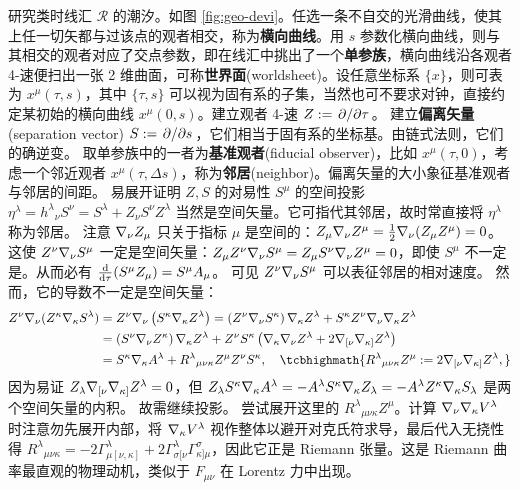 研究类时线汇 $\mathscr R$ 的潮汐。如图 \ref{fig:geo-devi}。任选一条不自交的光滑曲线，使其上任一切矢都与过该点的观者相交，称为\textbf{横向曲线}。用 $s$ 参数化横向曲线，则与其相交的观者对应了交点参数，即在线汇中挑出了一个\textbf{单参族}，横向曲线沿各观者 4-速便扫出一张 2 维曲面，可称\textbf{世界面}(worldsheet)。设任意坐标系 $\{x\}$，则可表为 $x^\mu(\tau,s)$，其中 $\{\tau,s\}$ 可以视为固有系的子集，当然也可不要求对钟，直接约定某初始的横向曲线 $x^\mu(0,s)$。建立观者 4-速 $Z:=\pdv*{\tau}$。
建立\textbf{偏离矢量}(separation vector) $S:=\pdv*{s}$，它们相当于固有系的坐标基。由链式法则，它们的确逆变。
取单参族中的一者为\textbf{基准观者}(fiducial observer)，比如 $x^\mu(\tau,0)$，考虑一个邻近观者 $x^\mu(\tau,\Delta s)$，称为\textbf{邻居}(neighbor)。偏离矢量的大小象征基准观者与邻居的间距。
易展开证明 $Z,S$ 的对易性
$S^\mu$ 的空间投影 $\eta^\lambda=h^\lambda{}_\nu S^\nu=S^\lambda+ Z_\nu S^\nu Z^\lambda$ 当然是空间矢量。它可指代其邻居，故时常直接将 $\eta^\lambda$ 称为邻居。
注意 $\nabla_\nu Z_\mu$ 只关于指标 $\mu$ 是空间的：$Z_\mu\nabla_\nu Z^\mu=\frac{1}{2}\nabla_\nu(Z_\mu Z^\mu)=0$。
这使 $Z^\nu\nabla_\nu S^\mu$ 一定是空间矢量：$Z_\mu Z^\nu \nabla_\nu S^\mu = Z_\mu S^\nu \nabla_\nu Z^\mu = 0$，即使 $S^\mu$ 不一定是。从而必有 $\dv{\tau}(S^\mu Z_\mu) = S^\mu A_\mu$。
可见 $Z^\nu\nabla_\nu S^\mu$ 可以表征邻居的相对速度。
然而，它的导数不一定是空间矢量：
\begin{align}
    Z^\nu \cd_\nu(Z^\kappa \cd_\kappa S^\lambda)&= Z^\nu \cd_\nu\left(S^\kappa\cd_\kappa Z^\lambda\right) = \left(Z^\nu \cd_\nu S^\kappa\right)\cd_\kappa Z^\lambda+S^\kappa Z^\nu \cd_\nu \cd_\kappa Z^\lambda\notag\\
    &= \left(S^\nu \cd_\nu Z^\kappa\right)\cd_\kappa Z^\lambda+Z^\nu S^\kappa\left(\cd_\kappa \cd_\nu Z^\lambda+2\cd_{[\nu}\cd_{\kappa]}Z^\lambda\right)\notag\\
    &=S^\kappa\cd_\kappa A^\lambda + R^\lambda{}_{\mu\nu\kappa} Z^\mu Z^\nu S^\kappa,\quad\tcbhighmath{R^\lambda{}_{\mu\nu\kappa}Z^\mu:= 2\cd_{[\nu}\cd_{\kappa]}Z^\lambda,}
\end{align}
因为易证 $Z_\lambda\nabla_{[\nu}\nabla_{\kappa]}Z^\lambda = 0$，但 $Z_\lambda S^\kappa\nabla_\kappa A^\lambda = -A^\lambda S^\kappa\nabla_\kappa Z_\lambda = -A^\lambda Z^\kappa\nabla_\kappa S_\lambda$ 是两个空间矢量的内积。
故需继续投影。
尝试展开这里的 $R^\lambda{}_{\mu\nu\kappa}Z^\mu$。计算 $\nabla_\nu\nabla_\kappa V^\lambda$ 时注意勿先展开内部，将 $\nabla_\kappa V^\lambda$ 视作整体以避开对克氏符求导，最后代入无挠性得
 $R^\lambda{}_{\mu\nu\kappa}=-2\Gamma^\lambda_{\mu[\nu,\kappa]}+2\Gamma^\lambda_{\sigma[\nu} \Gamma^\sigma_{\kappa]\mu}$，因此它正是 Riemann 张量。这是 Riemann 曲率最直观的物理动机，类似于 $F_{\mu\nu}$ 在 Lorentz 力中出现。

